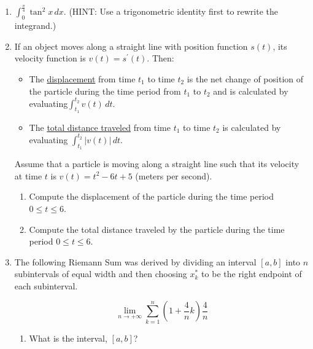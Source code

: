 \documentclass[12pt]{article}
\newif\ifans
\begin{document}
\begin{enumerate}
\item $\int_0^{\frac{\pi}{4}} \tan^2{x} \,dx$.  (HINT: Use a trigonometric identity first to rewrite the integrand.)

\ifans{\fbox{$1-\frac{\pi}{4}$}} \fi

\item {} If an object moves along a straight line with position function $s(t)$, its velocity function is $v(t)=s^{\prime}(t)$.  Then:

\begin{itemize}

\item The \underline{displacement} from time $t_1$ to time $t_2$ is the net change of position of the particle during the time period from $t_1$ to $t_2$ and is calculated by evaluating$\int_{t_1}^{t_2} v(t) \,dt$.

\item The \underline{total distance traveled} from time $t_1$ to time $t_2$ is calculated by evaluating $\int_{t_1}^{t_2} |v(t)| \,dt$.

\end{itemize}

Assume that a particle is moving along a straight line such that its velocity at time $t$ is $v(t)=t^2-6t+5$  (meters per second).  
\begin{enumerate}

\item Compute the displacement of the particle during the time period $0 \leq t \leq 6$.

\ifans{\fbox{$-6$ meters}} \fi

\item Compute the total distance traveled by the particle during the time period $0 \leq t \leq 6$.

\ifans{\fbox{$\frac{46}{3}$ meters}} \fi

\end{enumerate}

\item The following Riemann Sum was derived by dividing an interval $[a,b]$ into $n$ subintervals of equal width and then choosing $x_k^*$ to be the right endpoint of each subinterval.

$$\lim_{n \rightarrow +\infty} \sum_{k=1}^n{\left(1+\frac{4}{n}k\right)\frac{4}{n}}$$

\begin{enumerate}

\item What is the interval, $[a,b]$?


\end{enumerate}
\end{enumerate}
\end{document}
